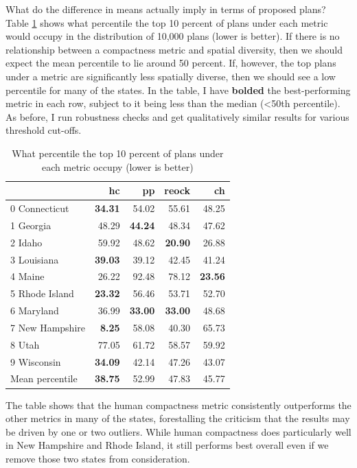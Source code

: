 \documentclass[]{article}
\begin{document}
What do the difference in means actually imply in terms of proposed
plans? Table \ref{table:top_plans_sd_percentile} shows what percentile
the top 10 percent of plans under each metric would occupy in the
distribution of 10,000 plans (lower is better). If there is no
relationship between a compactness metric and spatial diversity, then we
should expect the mean percentile to lie around 50 percent. If, however,
the top plans under a metric are significantly less spatially diverse,
then we should see a low percentile for many of the states. In the
table, I have \textbf{bolded} the best-performing metric in each row,
subject to it being less than the median (\textless{}50th percentile).
As before, I run robustness checks and get qualitatively similar results
for various threshold cut-offs.

\begin{table}[h!]
\begin{center}
\caption{What percentile the top 10 percent of plans under each metric occupy (lower is better)}
\label{table:top_plans_sd_percentile}
\begin{tabular}{@{\extracolsep{3pt}}lrrrr} 
\toprule
{} &     hc &     pp &  reock &     ch \\
\midrule
0 Connecticut &  \textbf{34.31} &  54.02 &  55.61 &  48.25 \\
1 Georgia &  48.29 &  \textbf{44.24} &  48.34 &  47.62 \\
2 Idaho &  59.92 &  48.62 &  \textbf{20.90} &  26.88 \\
3 Louisiana &  \textbf{39.03} &  39.12 &  42.45 &  41.24 \\
4 Maine &  26.22 &  92.48 &  78.12 &  \textbf{23.56} \\
5 Rhode Island &  \textbf{23.32} &  56.46 &  53.71 &  52.70 \\
6 Maryland &  36.99 &  \textbf{33.00} &  \textbf{33.00} &  48.68 \\
7 New Hampshire &   \textbf{8.25} &  58.08 &  40.30 &  65.73 \\
8 Utah &  77.05 &  61.72 &  58.57 &  59.92 \\
9 Wisconsin &  \textbf{34.09} &  42.14 &  47.26 &  43.07 \\
\bottomrule
Mean percentile & \textbf{38.75} &  52.99  &  47.83 &  45.77 \\
\bottomrule
\end{tabular}
\end{center}
\end{table}

The table shows that the human compactness metric consistently
outperforms the other metrics in many of the states, forestalling the
criticism that the results may be driven by one or two outliers. While
human compactness does particularly well in New Hampshire and Rhode
Island, it still performs best overall even if we remove those two
states from consideration.
\end{document}
